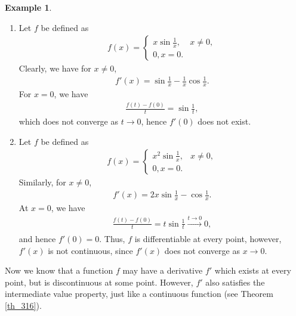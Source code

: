 \documentclass[10pt]{book}
\theoremstyle{definition}
\newtheorem{example}{Example}[chapter]
\numberwithin{equation}{chapter}
\begin{document}
\medskip

\begin{example}
~\begin{enumerate}[label=(\alph*)]
    \item Let $f$ be defined as
    \begin{align*}
        f(x) = \begin{cases}
            x \sin \frac{1}{x}, & x \neq 0, \\
            0, x = 0.
        \end{cases}
    \end{align*}
    Clearly, we have for $x \neq 0$,
    \begin{align*}
        f'(x) = \sin \frac{1}{x} - \frac{1}{x} \cos \frac{1}{x}.
    \end{align*}
    For $x = 0$, we have
    \begin{align*}
        \frac{f(t) - f(0)}{t} = \sin \frac{1}{t},
    \end{align*}
    which does not converge as $t \to 0$, hence $f'(0)$ does not exist.
    
    \item Let $f$ be defined as
    \begin{align*}
        f(x) = \begin{cases}
            x^2 \sin \frac{1}{x}, & x \neq 0, \\
            0, x = 0.
        \end{cases}
    \end{align*}
    Similarly, for $x \neq 0$,
    \begin{align*}
        f'(x) = 2x \sin \frac{1}{x} - \cos \frac{1}{x}.
    \end{align*}
    At $x = 0$, we have
    \begin{align*}
        \frac{f(t) - f(0)}{t} = t \sin \frac{1}{t} \xrightarrow[]{t \to 0} 0, 
    \end{align*}
    and hence $f'(0) = 0$. Thus, $f$ is differentiable at every point, however, $f'(x)$ is not continuous, since $f'(x)$ does not converge as $x \to 0$.
\end{enumerate}
\end{example}

\medskip

Now we know that a function $f$ may have a derivative $f'$ which exists at every point, but is discontinuous at some point. However, $f'$ also satisfies the intermediate value property, just like a continuous function (see Theorem \ref{th_316}).
\end{document}
